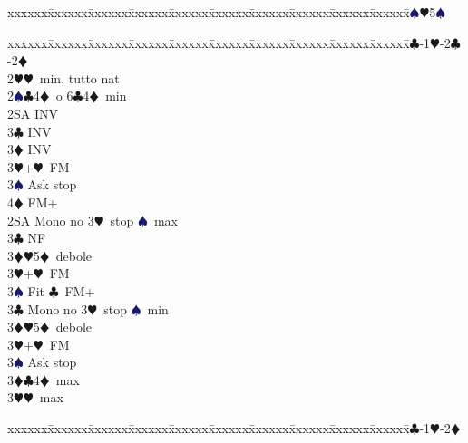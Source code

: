 \documentclass[a4paper,italian]{article}
\newcommand{\BC}{\textcolor{OliveGreen}{$\clubsuit$}}
\newcommand{\BD}{\textcolor{RedOrange}{$\vardiamondsuit$}}
\newcommand{\BH}{\textcolor{Red2}{$\varheartsuit${}}}
\newcommand{\BS}{\textcolor{MidnightBlue}{$\spadesuit${}}}
\newenvironment{bidtable}
{\begin{tabbing}

    xxxxxx\=xxxxxx\=xxxxxx\=xxxxxx\=xxxxxx\=xxxxxx\=xxxxxx\=xxxxxx\=xxxxxx\=xxxxxx\=\kill}
{\end{tabbing} }%
\begin{document}
\begin{multicols}{2}
\begin{bidtable}
                                        3\BS {}\BH 5\BS \-
                                    \end{bidtable}
                                    \bigbreak
                                    \begin{bidtable}
                                        1\BC-1\BH-2\BC-2\BD\+\\
                                        2\BH {}\BH\ min, tutto nat\\
                                        2\BS {}\BC 4\BD\ o 6\BC 4\BD\ min\+\\
                                        2SA \> INV\\
                                        3\BC \> INV\\
                                        3\BD \> INV\\
                                        3\BH {}+\BH\ FM\\
                                        3\BS \> Ask stop\\
                                        4\BD \> FM+\-\\
                                        2SA \> Mono no 3\BH\ stop \BS\ max\+\\
                                        3\BC \> NF\\
                                        3\BD {}\BH 5\BD\ debole\\
                                        3\BH {}+\BH\ FM\\
                                        3\BS \> Fit \BC\ FM+\-\\
                                        3\BC \> Mono no 3\BH\ stop \BS\ min\+\\
                                        3\BD {}\BH 5\BD\ debole\\
                                        3\BH {}+\BH\ FM\\
                                        3\BS \> Ask stop\-\\
                                        3\BD {}\BC 4\BD\ max\\
                                        3\BH {}\BH\ max\-
                                    \end{bidtable}
                                    \bigbreak
                                    \begin{bidtable}
                                        1\BC-1\BH-2\BD\+\\

\end{bidtable}
\end{multicols}
\end{document}
